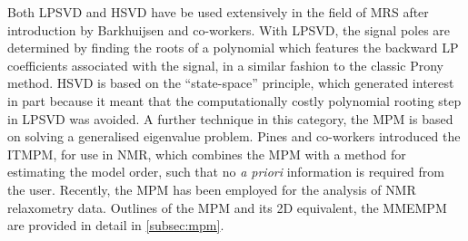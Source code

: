 Both \ac{LPSVD}\cite{Kumaresan1982,Kumaresan1983} and
\ac{HSVD}\cite{Kung1983} have be used extensively in the field of \ac{MRS}
after introduction by Barkhuijsen and
co-workers\cite{Barkhuijsen1985a,Barkhuijsen1985b,Barkhuijsen1987,Beer1988,Pijnappel1992}.
With
\ac{LPSVD}, the signal poles are determined by finding the roots of a
polynomial which features the backward \ac{LP} coefficients associated with the
signal, in a similar fashion to the classic Prony method\cite{Prony1795}.
\ac{HSVD} is based on the ``state-space'' principle, which generated interest
in part because it meant that the computationally costly polynomial rooting
step in \ac{LPSVD} was avoided.
A further technique in this category, the
\ac{MPM}\cite{Hua1990,Hua1990b,Hua1991} is based on solving a generalised
eigenvalue problem.  Pines and co-workers introduced the \ac{ITMPM}\cite{Lin1997},
for use in \ac{NMR}, which combines the \ac{MPM} with a method for estimating
the model order, such that no \textit{a priori} information is required from
the user.  Recently, the \ac{MPM} has been employed for the analysis of
\ac{NMR} relaxometry data\cite{Fricke2020, Wortge2023}.  Outlines of the
\ac{MPM} and its \ac{2D} equivalent, the \ac{MMEMPM}\cite{Hua1992,Chen2007} are
provided in detail in \cref{subsec:mpm}.


